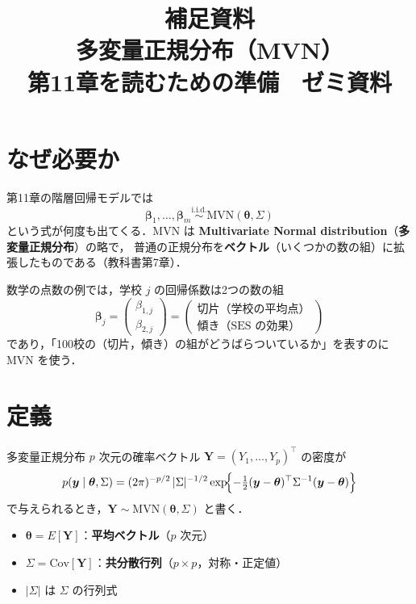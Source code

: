 \documentclass[lualatex,ja=standard,a4paper,12pt]{bxjsarticle}
\title{補足資料 \\[6pt]
       \textbf{多変量正規分布（MVN）} \\[4pt]
       {\normalsize 第11章を読むための準備　ゼミ資料}}
\author{}
\date{}
\newcommand{\mvn}{\mathrm{MVN}}
\begin{document}
\maketitle
\thispagestyle{empty}

\section{なぜ必要か}

第11章の階層回帰モデルでは
\[
  \bm{\beta}_1, \ldots, \bm{\beta}_m \overset{\text{i.i.d.}}{\sim} \mvn(\bm{\theta}, \Sigma)
\]
という式が何度も出てくる．$\mvn$ は \textbf{Multivariate Normal distribution}（\textbf{多変量正規分布}）の略で，
普通の正規分布を\textbf{ベクトル}（いくつかの数の組）に拡張したものである（教科書第7章）．

\medskip
数学の点数の例では，学校 $j$ の回帰係数は2つの数の組
\[
  \bm{\beta}_j = \begin{pmatrix} \beta_{1,j} \\ \beta_{2,j} \end{pmatrix}
  = \begin{pmatrix} \text{切片（学校の平均点）} \\ \text{傾き（SES の効果）} \end{pmatrix}
\]
であり，「100校の（切片，傾き）の組がどうばらついているか」を表すのに $\mvn$ を使う．

\section{定義}

\begin{defbox}{多変量正規分布}
$p$ 次元の確率ベクトル $\bm{Y} = (Y_1, \ldots, Y_p)^\top$ の密度が
\[
  p(\bm{y} \mid \bm{\theta}, \Sigma)
  = (2\pi)^{-p/2}\,|\Sigma|^{-1/2}
    \exp\!\Bigl\{-\tfrac12(\bm{y} - \bm{\theta})^\top \Sigma^{-1}(\bm{y} - \bm{\theta})\Bigr\}
\]
で与えられるとき，$\bm{Y} \sim \mvn(\bm{\theta}, \Sigma)$ と書く．
\begin{itemize}
  \item $\bm{\theta} = E[\bm{Y}]$：\textbf{平均ベクトル}（$p$ 次元）
  \item $\Sigma = \mathrm{Cov}[\bm{Y}]$：\textbf{共分散行列}（$p \times p$，対称・正定値）
  \item $|\Sigma|$ は $\Sigma$ の行列式
\end{itemize}
\end{defbox}
\end{document}
